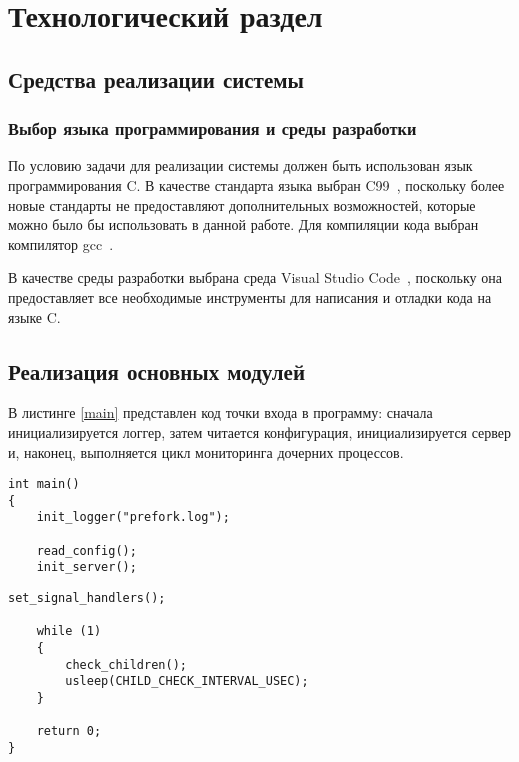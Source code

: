 \section{Технологический раздел}

\subsection{Средства реализации системы}

\subsubsection{Выбор языка программирования и среды разработки}

По условию задачи для реализации системы должен быть использован язык программирования C. В качестве стандарта языка выбран C99~\cite{c99}, поскольку более новые стандарты не предоставляют дополнительных возможностей, которые можно было бы использовать в данной работе. Для компиляции кода выбран компилятор gcc~\cite{gcc}.

В качестве среды разработки выбрана среда Visual Studio Code~\cite{vscode}, поскольку она предоставляет все необходимые инструменты для написания и отладки кода на языке C.

\subsection{Реализация основных модулей}

В листинге \ref{main} представлен код точки входа в программу: сначала инициализируется логгер, затем читается конфигурация, инициализируется сервер и, наконец, выполняется цикл мониторинга дочерних процессов.

\captionsetup{singlelinecheck = false, justification=raggedright}
\begin{lstlisting}[caption={Точка входа в программу}, label=main]
int main()
{
	init_logger("prefork.log");
	
	read_config();
	init_server();
\end{lstlisting}

\begin{lstlisting}[title={Окончание листинга \ref{main}}, label=main1, firstnumber=7]
	set_signal_handlers();

	while (1)
	{
		check_children();
		usleep(CHILD_CHECK_INTERVAL_USEC);
	}

	return 0;
}
\end{lstlisting}

